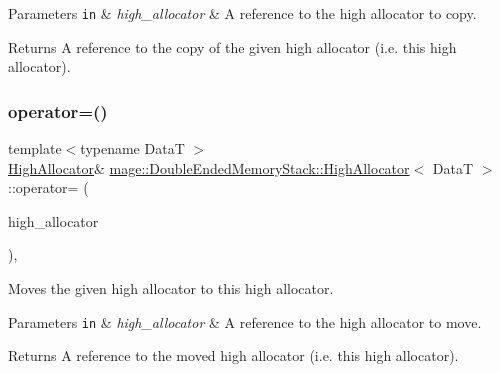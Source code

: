 \begin{DoxyParams}[1]{Parameters}
\mbox{\tt in}  & {\em high\+\_\+allocator} & A reference to the high allocator to copy. \\
\hline
\end{DoxyParams}
\begin{DoxyReturn}{Returns}
A reference to the copy of the given high allocator (i.\+e. this high allocator). 
\end{DoxyReturn}
\mbox{\label{classmage_1_1_double_ended_memory_stack_1_1_high_allocator_aa596d086d499f6c9369edecc4aa22882}} 
\subsubsection{\texorpdfstring{operator=()}{operator=()}\hspace{0.1cm}{\footnotesize\ttfamily [2/2]}}
{\footnotesize\ttfamily template$<$typename DataT $>$ \\
\mbox{\hyperlink{classmage_1_1_double_ended_memory_stack_1_1_high_allocator}{High\+Allocator}}\& \mbox{\hyperlink{classmage_1_1_double_ended_memory_stack_1_1_high_allocator}{mage\+::\+Double\+Ended\+Memory\+Stack\+::\+High\+Allocator}}$<$ DataT $>$\+::operator= (\begin{DoxyParamCaption}\item[{\mbox{\hyperlink{classmage_1_1_double_ended_memory_stack_1_1_high_allocator}{High\+Allocator}}$<$ DataT $>$ \&\&}]{high\+\_\+allocator }\end{DoxyParamCaption})\hspace{0.3cm}{\ttfamily [default]}, {\ttfamily [noexcept]}}

Moves the given high allocator to this high allocator.


\begin{DoxyParams}[1]{Parameters}
\mbox{\tt in}  & {\em high\+\_\+allocator} & A reference to the high allocator to move. \\
\hline
\end{DoxyParams}
\begin{DoxyReturn}{Returns}
A reference to the moved high allocator (i.\+e. this high allocator). 
\end{DoxyReturn}
\mbox{\label{classmage_1_1_double_ended_memory_stack_1_1_high_allocator_a452887cb961e5a0f6919d0497c0e2617}} 
